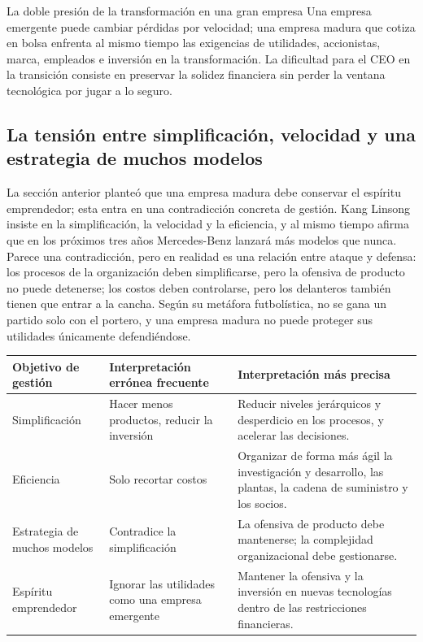 \begin{warningbox}{La doble presión de la transformación en una gran empresa}
Una empresa emergente puede cambiar pérdidas por velocidad; una empresa madura que cotiza en bolsa enfrenta al mismo tiempo las exigencias de utilidades, accionistas, marca, empleados e inversión en la transformación. La dificultad para el CEO en la transición consiste en preservar la solidez financiera sin perder la ventana tecnológica por jugar a lo seguro.
\end{warningbox}

\subsection{La tensión entre simplificación, velocidad y una estrategia de muchos modelos}

La sección anterior planteó que una empresa madura debe conservar el espíritu emprendedor; esta entra en una contradicción concreta de gestión. Kang Linsong insiste en la simplificación, la velocidad y la eficiencia, y al mismo tiempo afirma que en los próximos tres años Mercedes-Benz lanzará más modelos que nunca. Parece una contradicción, pero en realidad es una relación entre ataque y defensa: los procesos de la organización deben simplificarse, pero la ofensiva de producto no puede detenerse; los costos deben controlarse, pero los delanteros también tienen que entrar a la cancha. Según su metáfora futbolística, no se gana un partido solo con el portero, y una empresa madura no puede proteger sus utilidades únicamente defendiéndose.

\noindent\begin{tabularx}{\textwidth}{p{}p{}X}
\toprule
Objetivo de gestión & Interpretación errónea frecuente & Interpretación más precisa \\
\midrule
Simplificación & Hacer menos productos, reducir la inversión & Reducir niveles jerárquicos y desperdicio en los procesos, y acelerar las decisiones. \\
Eficiencia & Solo recortar costos & Organizar de forma más ágil la investigación y desarrollo, las plantas, la cadena de suministro y los socios. \\
Estrategia de muchos modelos & Contradice la simplificación & La ofensiva de producto debe mantenerse; la complejidad organizacional debe gestionarse. \\
Espíritu emprendedor & Ignorar las utilidades como una empresa emergente & Mantener la ofensiva y la inversión en nuevas tecnologías dentro de las restricciones financieras. \\
\bottomrule
\end{tabularx}

